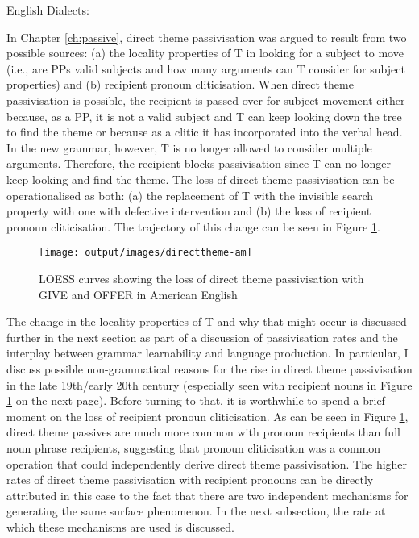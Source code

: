 \begin{exe}
	 English Dialects:
		\begin{xlist}
		\end{xlist}
\end{exe}
	
	In Chapter \ref{ch:passive}, direct theme passivisation was argued to result from two possible sources: (a) the locality properties of T in looking for a subject to move (i.e., are PPs valid subjects and how many arguments can T consider for subject properties) and (b) recipient pronoun cliticisation. When direct theme passivisation is possible, the recipient is passed over for subject movement either because, as a PP, it is not a valid subject and T can keep looking down the tree to find the theme or because as a clitic it has incorporated into the verbal head. In the new grammar, however, T is no longer allowed to consider multiple arguments. Therefore, the recipient blocks passivisation since T can no longer keep looking and find the theme. The loss of direct theme passivisation can be operationalised as both: (a) the replacement of T with the invisible search property with one with defective intervention and (b) the loss of recipient pronoun cliticisation. The trajectory of this change can be seen in Figure \ref{fig:loss-of-dt-in-amen}.

	\begin{figure}[ht!]
		\texttt{[image: output/images/directtheme-am]}
		\caption{LOESS curves showing the loss of direct theme passivisation with GIVE and OFFER in American English}
		\label{fig:loss-of-dt-in-amen}
	\end{figure}

	The change in the locality properties of T and why that might occur is discussed further in the next section as part of a discussion of passivisation rates and the interplay between grammar learnability and language production. In particular, I discuss possible non-grammatical reasons for the rise in direct theme passivisation in the late 19th/early 20th century (especially seen with recipient nouns in Figure \ref{fig:loss-of-dt-in-amen} on the next page). Before turning to that, it is worthwhile to spend a brief moment on the loss of recipient pronoun cliticisation. As can be seen in Figure \ref{fig:loss-of-dt-in-amen}, direct theme passives are much more common with pronoun recipients than full noun phrase recipients, suggesting that pronoun cliticisation was a common operation that could independently derive direct theme passivisation. The higher rates of direct theme passivisation with recipient pronouns can be directly attributed in this case to the fact that there are two independent mechanisms for generating the same surface phenomenon. In the next subsection, the rate at which these mechanisms are used is discussed.
	
